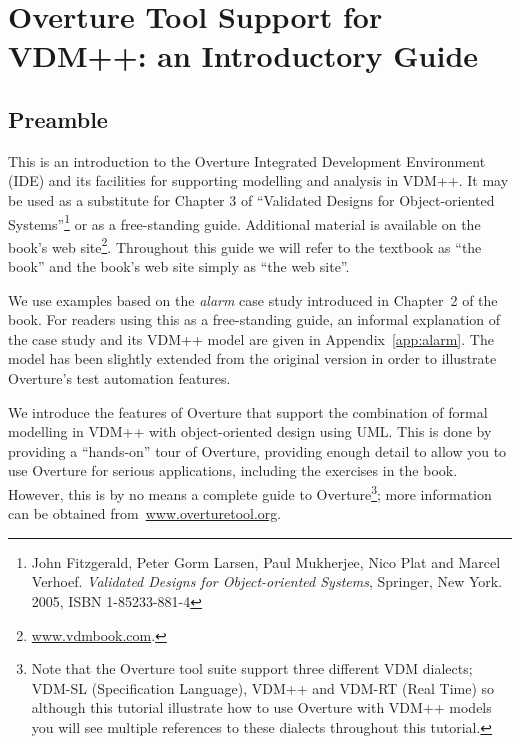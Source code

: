 \chapter{Overture Tool Support for VDM++: an Introductory Guide}\label{cha:toolbox}
\initexercise

\section*{Preamble}

This is an introduction to the Overture Integrated Development
Environment (IDE) and its facilities for supporting modelling and
analysis in VDM++. It may be used as a substitute for Chapter 3 of
``Validated Designs for Object-oriented Systems''\footnote{John
  Fitzgerald, Peter Gorm Larsen, Paul Mukherjee, Nico Plat and Marcel
  Verhoef. \emph{Validated Designs for Object-oriented Systems},
  Springer, New York. 2005, ISBN 1-85233-881-4} or as a free-standing
guide. Additional material is available on the book's web
site\footnote{\url{www.vdmbook.com}.}. Throughout this guide we will refer to
the textbook as ``the book'' and the book's web site simply as ``the
web site''.

We use examples based on the \emph{alarm} case study introduced in
Chapter~2 of the book. For readers using this as a
free-standing guide, an informal explanation of the case study and its
VDM++ model are given in Appendix~\ref{app:alarm}. The model has been slightly
extended from the original version in order to illustrate Overture's
test automation features.

We introduce the features of Overture that support the combination of
formal modelling in VDM++ with object-oriented design using UML. This
is done by providing a ``hands-on'' tour of Overture, providing enough
detail to allow you to use Overture for serious applications,
including the exercises in the book. However, this is by no means a
complete guide to Overture\footnote{Note that the Overture tool suite support three
  different VDM dialects; VDM-SL (Specification Language), VDM++ and
  VDM-RT (Real Time) so although this tutorial illustrate how to use
  Overture with VDM++ models you will see multiple references to
  these dialects throughout this tutorial.}; more information can be obtained
from~\url{www.overturetool.org}.


